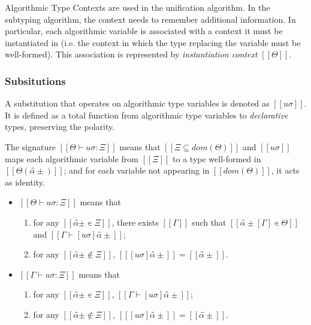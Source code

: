 Algorithmic Type Contexts are used in the unification algorithm.
In the subtyping algorithm, 
the context needs to remember additional information.
In particular, each algorithmic variable is associated with a
context it must be instantiated in 
(i.e. the context in which the type replacing the variable must be well-formed).
This association is represented by \emph{instantiation context} $[[Θ]]$.

\subsubsection{Subsitutions}

A substitution that operates on algorithmic type variables is denoted as
$[[uσ]]$. It is defined as a total function from algorithmic 
type variables to \emph{declarative} types, preserving the polarity.

The signature $[[Θ ⊢ uσ : Ξ]]$ means that
$[[Ξ ⊆ dom(Θ)]]$ and 
$[[uσ]]$ maps each algorithmic variable 
from $[[Ξ]]$ to a type well-formed in $[[Θ(α̂±)]]$;
and for each variable not appearing in $[[dom(Θ)]]$, 
it acts as identity.

\begin{definition}
  \label{def:algo-subst-sig}
  \hfill
  \begin{itemize}
    \item $[[Θ ⊢ uσ : Ξ]]$ means that
      \begin{enumerate}
        \item for any $[[α̂± ∊ Ξ]]$,
          there exists $[[Γ]]$ such that $[[ α̂±[Γ] ∊ Θ ]]$
          and $[[ Γ ⊢ [uσ]α̂± ]]$; 
        \item for any $[[ α̂± ∉ Ξ]]$, $[[ [uσ]α̂± ]] =  [[ α̂± ]]$.
      \end{enumerate}
    \item $[[Γ ⊢ uσ : Ξ]]$ means that
      \begin{enumerate}
        \item for any $[[α̂± ∊ Ξ]]$, $[[ Γ ⊢ [uσ]α̂± ]]$; 
        \item for any $[[ α̂± ∉ Ξ]]$, $[[ [uσ]α̂± ]] =  [[ α̂± ]]$.
      \end{enumerate}
  \end{itemize}
\end{definition}

